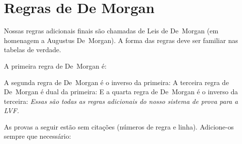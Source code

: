 
\section{Regras de De Morgan}
Nossas regras adicionais finais s\~ao chamadas de Leis de De~Morgan (em homenagem a Augustus De~Morgan). A forma das regras deve ser familiar nas tabelas de verdade.

 A primeira regra de De~Morgan \'e:
 
A segunda regra de De~Morgan \'e o inverso da primeira:
A terceira regra de De~Morgan \'e dual da primeira:
E a quarta regra de De~Morgan \'e o inverso da terceira:
\emph{Essas s\~ao todas as regras adicionais do nosso sistema de prova para a  LVF.}

\practiceproblems
\solutions
\problempart
\label{pr.justifyTFLproof}
As provas a seguir est\~ao sem cita\c c\~oes (n\'umeros de regra e linha). Adicione-os sempre que necess\'ario:

